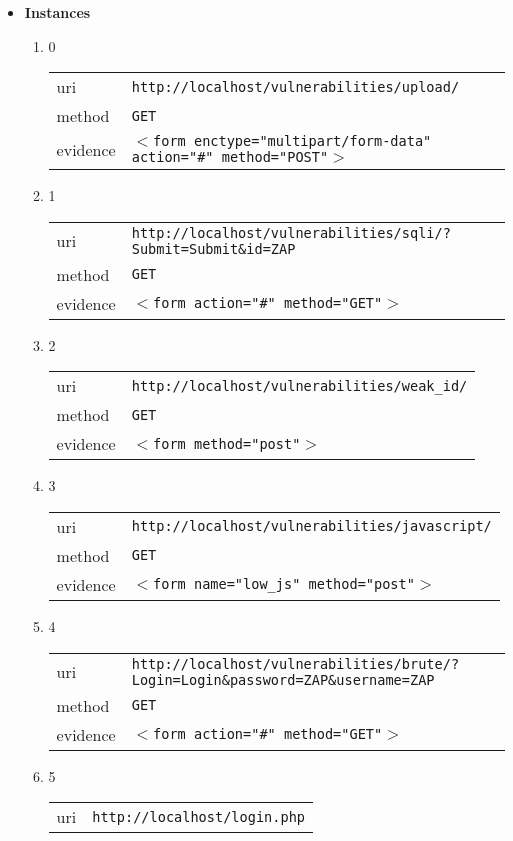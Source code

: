 \documentclass[10pt]{article}
\begin{document}
\begin{itemize}
\item[] \textbf{Instances}
\begin{enumerate}
\item[] 0
\begin{tabular}{| l | p{12cm}}
uri & \texttt{http://localhost/vulnerabilities/upload/} \\
method & \texttt{GET} \\
evidence & \texttt{$<$form enctype="multipart/form-data" action="\#" method="POST"$>$} \\
\end{tabular}
\item[] 1
\begin{tabular}{| l | p{12cm}}
uri & \texttt{http://localhost/vulnerabilities/sqli/?Submit=Submit\&id=ZAP} \\
method & \texttt{GET} \\
evidence & \texttt{$<$form action="\#" method="GET"$>$} \\
\end{tabular}
\item[] 2
\begin{tabular}{| l | p{12cm}}
uri & \texttt{http://localhost/vulnerabilities/weak\_id/} \\
method & \texttt{GET} \\
evidence & \texttt{$<$form method="post"$>$} \\
\end{tabular}
\item[] 3
\begin{tabular}{| l | p{12cm}}
uri & \texttt{http://localhost/vulnerabilities/javascript/} \\
method & \texttt{GET} \\
evidence & \texttt{$<$form name="low\_js" method="post"$>$} \\
\end{tabular}
\item[] 4
\begin{tabular}{| l | p{12cm}}
uri & \texttt{http://localhost/vulnerabilities/brute/?Login=Login\&password=ZAP\&username=ZAP} \\
method & \texttt{GET} \\
evidence & \texttt{$<$form action="\#" method="GET"$>$} \\
\end{tabular}
\item[] 5
\begin{tabular}{| l | p{12cm}}
uri & \texttt{http://localhost/login.php} \\

\end{tabular}
\end{enumerate}
\end{itemize}
\end{document}
